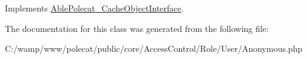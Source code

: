 Implements \hyperlink{interface_able_polecat___cache_object_interface_a3f2135f6ad45f51d075657f6d20db2cd}{Able\+Polecat\+\_\+\+Cache\+Object\+Interface}.



The documentation for this class was generated from the following file\+:\begin{DoxyCompactItemize}
\item 
C\+:/wamp/www/polecat/public/core/\+Access\+Control/\+Role/\+User/Anonymous.\+php\end{DoxyCompactItemize}
